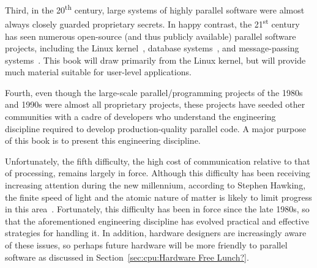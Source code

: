Third, in the 20\textsuperscript{th} century, large systems of
highly parallel software were almost always closely guarded proprietary
secrets.
In happy contrast, the 21\textsuperscript{st} century has seen numerous
open-source (and thus publicly available) parallel software projects,
including the Linux kernel~\cite{Torvalds2.6kernel},
database systems~\cite{PostgreSQL2008,MySQL2008},
and message-passing systems~\cite{OpenMPI2008,BOINC2008}.
This book will draw primarily from the Linux kernel, but will
provide much material suitable for user-level applications.

Fourth, even though the large-scale parallel\-/programming projects of
the 1980s and 1990s were almost all proprietary projects, these
projects have seeded other communities with a cadre of developers who
understand the engineering discipline required to develop production-quality
parallel code.
A major purpose of this book is to present this engineering discipline.

Unfortunately, the fifth difficulty, the high cost of communication
relative to that of processing, remains largely in force.
Although this difficulty has been receiving increasing attention during
the new millennium, according to Stephen Hawking,
the finite speed of light and the atomic
nature of matter is likely to limit progress in this
area~\cite{BryanGardiner2007,GordonMoore03a}.
Fortunately, this difficulty has been in force since the late 1980s,
so that the aforementioned engineering discipline has evolved practical
and effective strategies for handling it.
In addition, hardware designers are increasingly aware of these issues,
so perhaps future hardware will be more friendly to parallel software
as discussed in Section~\ref{sec:cpu:Hardware Free Lunch?}.

